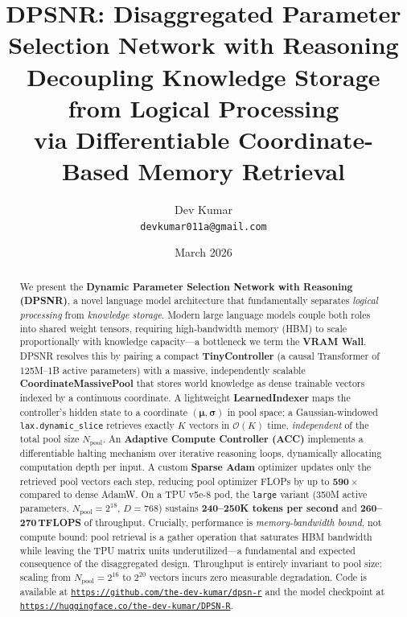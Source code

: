 \documentclass[11pt]{article}
\title{%
  \textbf{DPSNR: Disaggregated Parameter Selection Network with Reasoning}\\[6pt]
  \large Decoupling Knowledge Storage from Logical Processing\\
  via Differentiable Coordinate-Based Memory Retrieval
}
\author{
  Dev Kumar\\[2pt]
  \texttt{devkumar011a@gmail.com}
}
\date{March 2026}
\begin{document}
\maketitle

\begin{abstract}
We present the \textbf{Dynamic Parameter Selection Network with Reasoning
(DPSNR)}, a novel language model architecture that fundamentally separates
\emph{logical processing} from \emph{knowledge storage}.
Modern large language models couple both roles into shared weight tensors,
requiring high-bandwidth memory (HBM) to scale proportionally with knowledge
capacity—a bottleneck we term the \textbf{VRAM Wall}.
DPSNR resolves this by pairing a compact \textbf{TinyController}
(a causal Transformer of 125M–1B active parameters) with a massive, independently
scalable \textbf{CoordinateMassivePool} that stores world knowledge as dense
trainable vectors indexed by a continuous coordinate.
A lightweight \textbf{LearnedIndexer} maps the controller's hidden state to a
coordinate $(\boldsymbol{\mu}, \boldsymbol{\sigma})$ in pool space; a
Gaussian-windowed \texttt{lax.dynamic\_slice} retrieves exactly $K$ vectors in
$\mathcal{O}(K)$ time, \emph{independent} of the total pool size $N_{\text{pool}}$.
An \textbf{Adaptive Compute Controller (ACC)} implements a differentiable
halting mechanism over iterative reasoning loops, dynamically allocating
computation depth per input.
A custom \textbf{Sparse Adam} optimizer updates only the retrieved pool vectors
each step, reducing pool optimizer FLOPs by up to $\mathbf{590\times}$ compared
to dense AdamW.
On a TPU v5e-8 pod, the \texttt{large} variant (350M active parameters,
$N_{\text{pool}}=2^{18}$, $D=768$) sustains \textbf{240--250K tokens per second}
and \textbf{260--270\,TFLOPS} of throughput.
Crucially, performance is \emph{memory-bandwidth bound}, not compute bound:
pool retrieval is a gather operation that saturates HBM bandwidth while leaving
the TPU matrix units underutilized—a fundamental and expected consequence of
the disaggregated design.
Throughput is entirely invariant to pool size: scaling from
$N_{\text{pool}} = 2^{16}$ to $2^{20}$ vectors incurs zero measurable degradation.
Code is available at \texttt{\url{https://github.com/the-dev-kumar/dpsn-r}} and the model checkpoint at \texttt{\url{https://huggingface.co/the-dev-kumar/DPSN-R}}.
\end{abstract}

\end{document}
